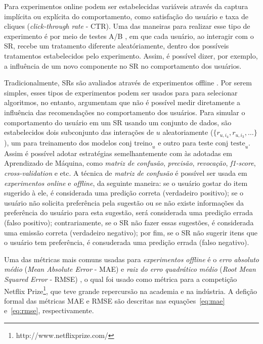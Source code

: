 \documentclass[normaltoc, espacoumemeio, pnumromarab,ruledheader]{abnt}
\begin{document}
Para experimentos online podem ser estabelecidas variáveis através da captura implícita ou explícita do comportamento, como satisfação do usuário e taxa de cliques (\textit{click-through rate} - CTR).
Uma das maneiras para realizar esse tipo de experimento é por meio de testes A/B \cite{Jannach2011}, em que cada usuário, ao interagir com o SR, recebe um tratamento diferente aleatóriamente, dentro dos possíveis tratamentos estabelecidos pelo experimento.
Assim, é possível dizer, por exemplo, a influência de um novo componente no SR no comportamento dos usuários.

Tradicionalmente, SRs são avaliados através de experimentos offline \cite{Jannach2011}.
Por serem simples, esses tipos de experimentos podem ser usados para para selecionar algoritmos, no entanto,  argumentam que não é possível medir diretamente a influência das recomendações no comportamento dos usuários.
Para simular o comportamento do usuário em um SR usando um conjunto de dados, são estabelecidos dois subconjunto das interações de $u$ aleatoriamente ($\{ r_{u,i_4}, r_{u,i_3}, \dots \}$), um para treinamento dos modelos $\text{conj treino}_u$ e outro para teste $\text{conj teste}_u$.
Assim é possível adotar estratégias semelhantemente com às adotadas em Aprendizado de Máquina, como \textit{matriz de confusão}, \textit{precisão}, \textit{revocação}, \textit{f1-score}, \textit{cross-validation} e etc.
A técnica de \textit{matriz de confusão} é possível ser usada em \textit{experimentos online} e \textit{offline}, da seguinte maneira: se o usuário gostar do item sugerido à ele, é considerada uma predição correta (verdadeiro positivo); se o usuário não solicita preferência pela sugestão ou se não existe informações da preferência do usuário para esta sugestão, será considerada uma predição errada (falso positivo); contrariamente, se o SR não fazer essas sugestões, é considerada uma emissão correta (verdadeiro negativo); por fim, se o SR não sugerir itens que o usuário tem preferência, é consuderada uma predição errada (falso negativo).

Uma das métricas mais comuns usadas para \textit{experimentos offline} é o \textit{erro absoluto médio} (\textit{Mean Absolute Error} - MAE) e \textit{raiz do erro quadrático médio} (\textit{Root Mean Squared Error} - RMSE) \cite{Jannach2011}, o qual foi usado como métrica para a competição Netflix Prize\footnote{http://www.netflixprize.com/}, que teve grande repercursão na academia e na indústria. A defição formal das métricas MAE e RMSE são descritas nas equações~\ref{eq:mae} e~\ref{eq:rmse}, respectivamente.
\end{document}
